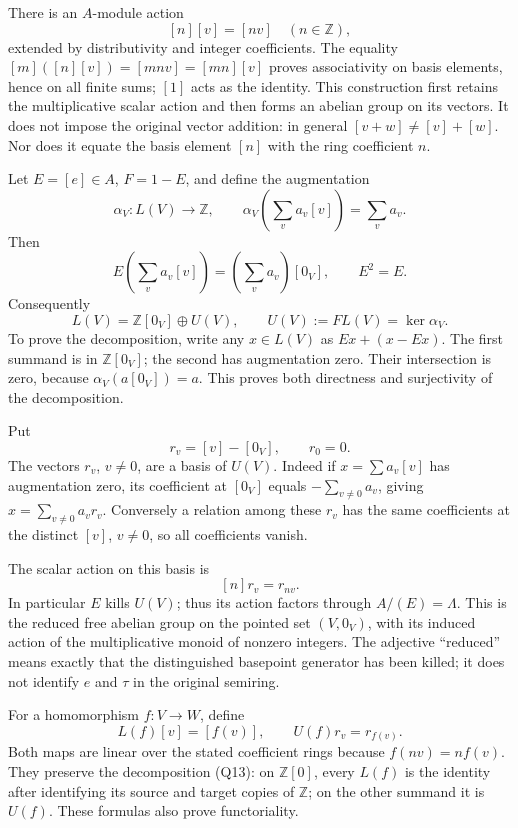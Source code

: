 \documentclass[
]{article}
\begin{document}
There is an \(A\)-module action \[
[n][v]=[nv]\quad(n\in\mathbb Z),
\tag{Q10}
\] extended by distributivity and integer coefficients. The equality
\([m]([n][v])=[mnv]=[mn][v]\) proves associativity on basis elements,
hence on all finite sums; \([1]\) acts as the identity. This
construction first retains the multiplicative scalar action and then
forms an abelian group on its vectors. It does not impose the original
vector addition: in general \([v+w]\ne[v]+[w]\). Nor does it equate the
basis element \([n]\) with the ring coefficient \(n\).

Let \(E=[e]\in A\), \(F=1-E\), and define the augmentation \[
\alpha_V:L(V)\to\mathbb Z,
\qquad\alpha_V\left(\sum_v a_v[v]\right)=\sum_v a_v.
\tag{Q11}
\] Then \[
E\left(\sum_v a_v[v]\right)
=\left(\sum_v a_v\right)[0_V],
\qquad E^2=E.
\tag{Q12}
\] Consequently \[
L(V)=\mathbb Z[0_V]\oplus U(V),
\qquad U(V):=FL(V)=\ker\alpha_V.
\tag{Q13}
\] To prove the decomposition, write any \(x\in L(V)\) as \(Ex+(x-Ex)\).
The first summand is in \(\mathbb Z[0_V]\); the second has augmentation
zero. Their intersection is zero, because \(\alpha_V(a[0_V])=a\). This
proves both directness and surjectivity of the decomposition.

Put \[
r_v=[v]-[0_V],\qquad r_0=0.
\tag{Q14}
\] The vectors \(r_v\), \(v\ne0\), are a basis of \(U(V)\). Indeed if
\(x=\sum a_v[v]\) has augmentation zero, its coefficient at \([0_V]\)
equals \(-\sum_{v\ne0}a_v\), giving \(x=\sum_{v\ne0}a_vr_v\). Conversely
a relation among these \(r_v\) has the same coefficients at the distinct
\([v]\), \(v\ne0\), so all coefficients vanish.

The scalar action on this basis is \[
[n]r_v=r_{nv}.
\tag{Q15}
\] In particular \(E\) kills \(U(V)\); thus its action factors through
\(A/(E)=\Lambda\). This is the reduced free abelian group on the pointed
set \((V,0_V)\), with its induced action of the multiplicative monoid of
nonzero integers. The adjective ``reduced'' means exactly that the
distinguished basepoint generator has been killed; it does not identify
\(e\) and \(\tau\) in the original semiring.

For a homomorphism \(f:V\to W\), define \[
L(f)[v]=[f(v)],\qquad U(f)r_v=r_{f(v)}.
\tag{Q16}
\] Both maps are linear over the stated coefficient rings because
\(f(nv)=nf(v)\). They preserve the decomposition (Q13): on
\(\mathbb Z[0]\), every \(L(f)\) is the identity after identifying its
source and target copies of \(\mathbb Z\); on the other summand it is
\(U(f)\). These formulas also prove functoriality.
\end{document}
